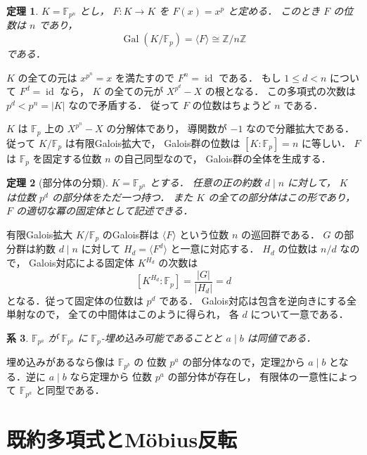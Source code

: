 \documentclass[a5paper,10pt,onecolumn]{jsarticle}
\makeatletter
\theoremstyle{mathnotetheorem}
\newtheorem{theorem}{定理}[section]
\newtheorem{corollary}[theorem]{系}
\renewcommand{\proofname}{証明}
\renewenvironment{proof}[1][\proofname]{%
  \par\pushQED{\qed}\normalfont\topsep4\p@\@plus2\p@\relax
  \trivlist\item[\hskip\labelsep\bfseries #1]\ignorespaces
}{\popQED\endtrivlist\@endpefalse}
\makeatother
\begin{document}
\begin{theorem}\label{thm:galois}
$K=\mathbb F_{p^n}$ とし，
$F:K\to K$ を $F(x)=x^p$ と定める．
このとき $F$ の位数は $n$ であり，
\[
 \operatorname{Gal}(K/\mathbb F_p)
 =\langle F\rangle\cong\mathbb Z/n\mathbb Z
\]
である．
\end{theorem}
\begin{proof}
$K$ の全ての元は $x^{p^n}=x$ を満たすので
$F^n=\operatorname{id}$ である．
もし $1\le d<n$ について
$F^d=\operatorname{id}$ なら，
$K$ の全ての元が $X^{p^d}-X$ の根となる．
この多項式の次数は $p^d<p^n=|K|$ なので矛盾する．
従って $F$ の位数はちょうど $n$ である．

$K$ は $\mathbb F_p$ 上の
$X^{p^n}-X$ の分解体であり，
導関数が $-1$ なので分離拡大である．
従って $K/\mathbb F_p$ は有限Galois拡大で，
Galois群の位数は
$[K:\mathbb F_p]=n$ に等しい．
$F$ は $\mathbb F_p$ を固定する位数 $n$ の自己同型なので，
Galois群の全体を生成する．
\end{proof}

\begin{theorem}[部分体の分類]\label{thm:subfields}
$K=\mathbb F_{p^n}$ とする．
任意の正の約数 $d\mid n$ に対して，
$K$ は位数 $p^d$ の部分体をただ一つ持つ．
また $K$ の全ての部分体はこの形であり，
$F$ の適切な冪の固定体として記述できる．
\end{theorem}
\begin{proof}
有限Galois拡大 $K/\mathbb F_p$ のGalois群は
$\langle F\rangle$ という位数 $n$ の巡回群である．
$G$ の部分群は約数 $d\mid n$ に対して
$H_d=\langle F^d\rangle$ と一意に対応する．
$H_d$ の位数は $n/d$ なので，
Galois対応による固定体 $K^{H_d}$ の次数は
\[
 [K^{H_d}:\mathbb F_p]
 =\frac{|G|}{|H_d|}=d
\]
となる．従って固定体の位数は $p^d$ である．
Galois対応は包含を逆向きにする全単射なので，
全ての中間体はこのように得られ，
各 $d$ について一意である．
\end{proof}

\begin{corollary}
$\mathbb F_{p^a}$ が $\mathbb F_{p^b}$ に
$\mathbb F_p$-埋め込み可能であることと
$a\mid b$ は同値である．
\end{corollary}
\begin{proof}
埋め込みがあるなら像は $\mathbb F_{p^b}$ の
位数 $p^a$ の部分体なので，定理\ref{thm:subfields}から
$a\mid b$ となる．逆に $a\mid b$ なら定理から
位数 $p^a$ の部分体が存在し，
有限体の一意性によって
$\mathbb F_{p^a}$ と同型である．
\end{proof}

\section{既約多項式とM\"obius反転}
\end{document}
